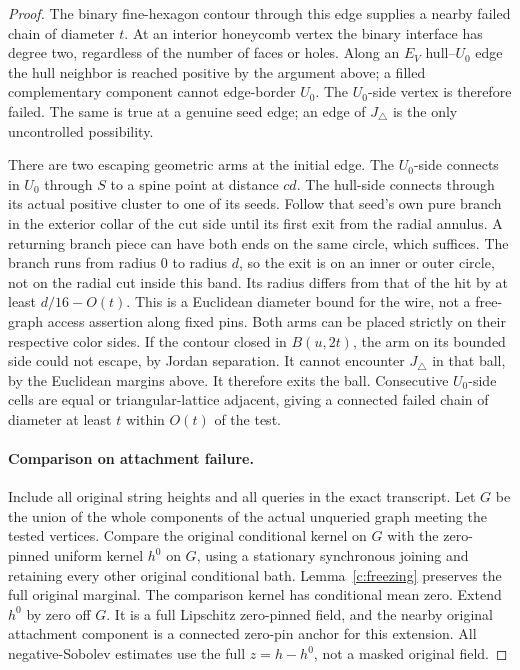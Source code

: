 \begin{proof}
The binary fine-hexagon contour through this edge supplies a nearby
failed chain of diameter \(t\).  At an interior honeycomb vertex the
binary interface has degree two, regardless of the number of faces
or holes.  Along an \(E_V\) hull--\(U_0\) edge the hull neighbor
is reached positive by the argument above; a filled complementary
component cannot edge-border \(U_0\).  The \(U_0\)-side vertex is
therefore failed.  The same is true at a genuine seed edge; an edge
of \(J_\triangle\) is the only uncontrolled possibility.

There are two escaping geometric arms at the initial edge.  The
\(U_0\)-side connects in \(U_0\) through \(S\) to a spine point at
distance \(c d\).  The hull-side connects through its actual positive
cluster to one of its seeds.  Follow that seed's own pure branch in
the exterior collar of the cut side until its first exit from the
radial annulus.  A returning branch piece can have both ends on the
same circle, which suffices.  The branch runs from radius \(0\) to
radius \(d\), so the exit is on an inner or outer circle, not on
the radial cut inside this band.  Its radius differs from that of
the hit by at least \(d/16-O(t)\).  This is a Euclidean diameter
bound for the wire, not a free-graph access assertion along fixed pins.
Both arms can be placed strictly on their respective color sides.
If the contour closed in \(B(u,2t)\), the arm on its bounded side
could not escape, by Jordan separation.  It cannot encounter
\(J_\triangle\) in that ball, by the Euclidean margins above.
It therefore exits the ball.  Consecutive \(U_0\)-side cells are
equal or triangular-lattice adjacent, giving a connected failed
chain of diameter at least \(t\) within \(O(t)\) of the test.

\paragraph{Comparison on attachment failure.}
Include all original string heights and all queries in the exact
transcript.  Let \(G\) be the union of the whole components of the
actual unqueried graph meeting the tested vertices.  Compare the
original conditional kernel on \(G\) with the zero-pinned uniform
kernel \(h^0\) on \(G\), using a stationary synchronous joining and
retaining every other original conditional bath.
Lemma~\ref{c:freezing} preserves the full original marginal.
The comparison kernel has conditional mean zero.  Extend \(h^0\)
by zero off \(G\).  It is a full Lipschitz zero-pinned field, and the
nearby original attachment component is a connected zero-pin anchor
for this extension.  All negative-Sobolev estimates use the full
\(z=h-h^0\), not a masked original field.


\end{proof}
